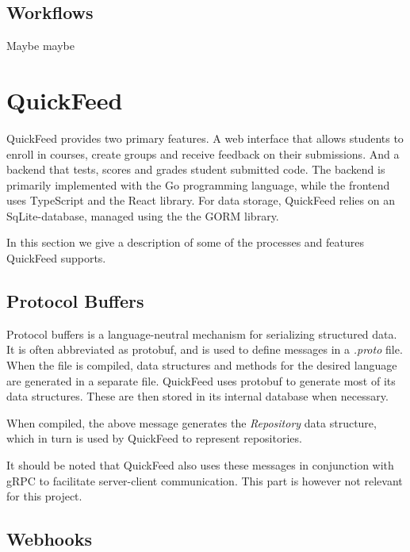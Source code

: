 \subsection{Workflows}

Maybe maybe

\section{QuickFeed}

QuickFeed provides two primary features.
A web interface that allows students to enroll in courses, create groups and receive feedback on their submissions.
And a backend that tests, scores and grades student submitted code.
The backend is primarily implemented with the Go programming language, while the frontend uses TypeScript and the React library.
For data storage, QuickFeed relies on an SqLite-database, managed using the the GORM library.

In this section we give a description of some of the processes and features QuickFeed supports.

\subsection{Protocol Buffers}

Protocol buffers is a language-neutral mechanism for serializing structured data. %
It is often abbreviated as protobuf, and is used to define messages in a \textit{.proto} file.
When the file is compiled, data structures and methods for the desired language are generated in a separate file.
QuickFeed uses protobuf to generate most of its data structures.
These are then stored in its internal database when necessary.



When compiled, the above message generates the \textit{Repository} data structure, which in turn is used by QuickFeed to represent repositories.

It should be noted that QuickFeed also uses these messages in conjunction with gRPC to facilitate server-client communication.
This part is however not relevant for this project.

\subsection{Webhooks}

